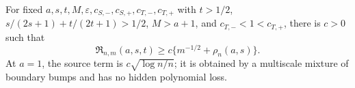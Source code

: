For fixed \(a,s,t,M,\varepsilon,c_{S,-},c_{S,+},c_{T,-},c_{T,+}\) with \(t>1/2\), \(s/(2s+1)+t/(2t+1)>1/2\), \(M>a+1\), and \(c_{T,-}<1<c_{T,+}\), there is \(c>0\) such that \[\mathfrak R_{n,m}(a,s,t)\ge c\{m^{-1/2}+\rho_n(a,s)\}.\] At \(a=1\), the source term is \(c\sqrt{\log n/n}\); it is obtained by a multiscale mixture of boundary bumps and has no hidden polynomial loss.